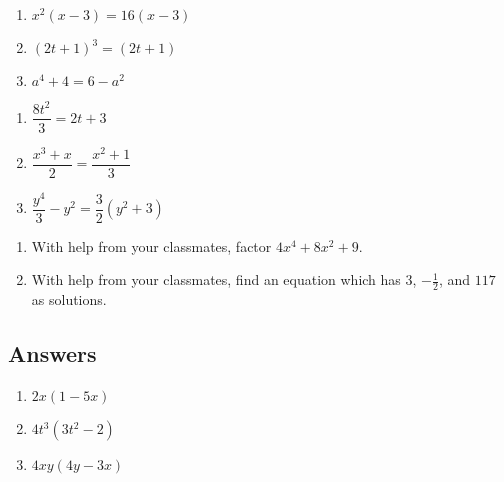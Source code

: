 \documentclass{ximera}
\begin{document}
\begin{multicols}{3}
\begin{enumerate}
\setcounter{enumi}{\value{HW}}

\item $x^2(x-3) = 16(x-3)$
\item $(2t+1)^3 = (2t+1)$
\item $a^4 + 4 = 6 - a^2$

\setcounter{HW}{\value{enumi}}
\end{enumerate}
\end{multicols}

\begin{multicols}{3}
\begin{enumerate}
\setcounter{enumi}{\value{HW}}

\item $\dfrac{8t^2}{3} = 2t+3$
\item $\dfrac{x^3+x}{2} = \dfrac{x^2+1}{3}$
\item $\dfrac{y^4}{3} - y^2 = \dfrac{3}{2} (y^2 + 3)$ \label{solvebyfactorlast}

\setcounter{HW}{\value{enumi}}
\end{enumerate}
\end{multicols}

\begin{enumerate}
\setcounter{enumi}{\value{HW}}

\item  With help from your classmates, factor $4x^4 + 8x^2 + 9$.  

\item  With help from your classmates, find an equation which has $3$, $-\frac{1}{2}$, and $117$ as solutions.  

\setcounter{HW}{\value{enumi}}
\end{enumerate}

\newpage

\subsection{Answers}

\begin{multicols}{3}
\begin{enumerate}

\item $2x(1 - 5x)$ 
\item $4t^3(3t^2-2)$
\item $4xy(4y-3x)$

\setcounter{HW}{\value{enumi}}
\end{enumerate}
\end{multicols}
\end{document}
